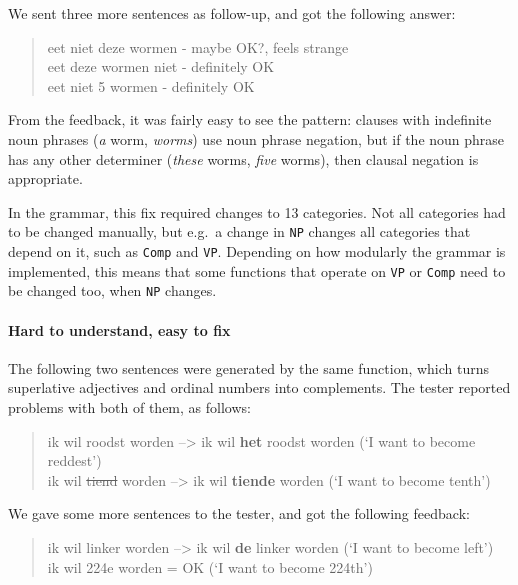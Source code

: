 \noindent We sent three more sentences as follow-up, and got the
following answer:

\begin{quote}
eet niet deze wormen - maybe OK?, feels strange\\eet deze wormen niet -
definitely OK\\eet niet 5 wormen - definitely OK
\end{quote}

\noindent From the feedback, it was fairly easy to see the pattern:
clauses with indefinite noun phrases (\emph{a} worm, \emph{worms}) use
noun phrase negation, but if the noun phrase has any other determiner
(\emph{these} worms, \emph{five} worms), then clausal negation is
appropriate. 

In the grammar, this fix required changes to 13 categories. Not all
categories had to be changed manually, but e.g.~a change in \texttt{NP}
changes all categories that depend on it, such as \texttt{Comp} and
\texttt{VP}. Depending on how modularly the grammar is implemented, this
means that some functions that operate on \texttt{VP} or \texttt{Comp}
need to be changed too, when \texttt{NP} changes.

\paragraph{Hard to understand, easy to fix}\label{hard-to-understand-easy-to-fix}

The following two sentences were generated by the same function, which
turns superlative adjectives and ordinal numbers into complements. The
tester reported problems with both of them, as follows:

\begin{quote}
ik wil roodst worden --\textgreater{} ik wil \textbf{het} roodst worden
(`I want to become reddest')\\ik wil \sout{tiend} worden
--\textgreater{} ik wil \textbf{tiende} worden (`I want to become
tenth')
\end{quote}

\noindent We gave some more sentences to the tester, and got the following
feedback:

\begin{quote}
ik wil linker worden --\textgreater{} ik wil \textbf{de} linker worden
(`I want to become left')\\ik wil 224e worden = OK (`I want to become
224th')
\end{quote}

